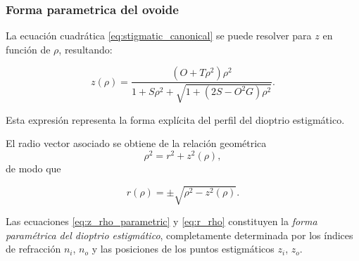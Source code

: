 \subsubsection{Forma parametrica del ovoide}

La ecuación cuadrática \eqref{eq:stigmatic_canonical} se puede resolver para $z$ en función de $\rho$, resultando:

\begin{equation}
z(\rho) = \frac{(O + T\rho^2)\rho^2}
{1 + S\rho^2 + \sqrt{1 + (2S - O^2 G)\rho^2}}.
\label{eq:z_rho_parametric}
\end{equation}

Esta expresión representa la forma explícita del perfil del dioptrio estigmático.



El radio vector asociado se obtiene de la relación geométrica
\[
\rho^2 = r^2 + z^2(\rho),
\]
de modo que

\begin{equation}
r(\rho) = \pm \sqrt{\rho^2 - z^2(\rho)}.
\label{eq:r_rho}
\end{equation}

Las ecuaciones \eqref{eq:z_rho_parametric} y \eqref{eq:r_rho} constituyen la \emph{forma paramétrica del dioptrio estigmático}, completamente determinada por los índices de refracción $n_i$, $n_o$ y las posiciones de los puntos estigmáticos $z_i$, $z_o$.


